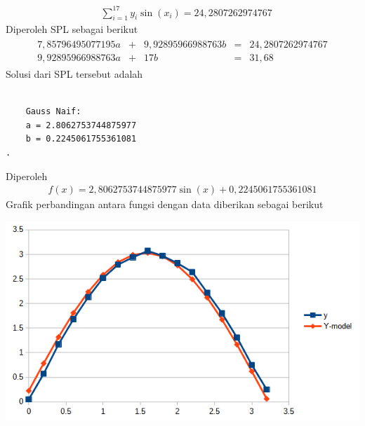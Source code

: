 \documentclass[12pt]{article}
\begin{document}
\begin{enumerate}
{\begin{align*}
            & \sum_{i = 1}^{17}y_i\sin(x_i) = 24,2807262974767
        \end{align*}
        Diperoleh SPL sebagai berikut
        \begin{align*}
            \begin{matrix}
                7,85796495077195a & + & 9,92895966988763b & = & 24,2807262974767 \\
                9,92895966988763a & + & 17b & = & 31,68
            \end{matrix}
        \end{align*}
        Solusi dari SPL tersebut adalah
        \begin{lstlisting}
            
    Gauss Naif:
    a = 2.8062753744875977
    b = 0.2245061755361081
.
        \end{lstlisting}
        Diperoleh
        \begin{align*}
            f(x) = 2,8062753744875977\sin(x) + 0,2245061755361081
        \end{align*}
        Grafik perbandingan antara fungsi dengan data diberikan sebagai berikut
        \begin{center}
            \includegraphics[scale=0.6]{hasil_5_b.png}
        \end{center}
    }
\end{enumerate}
\end{document}
